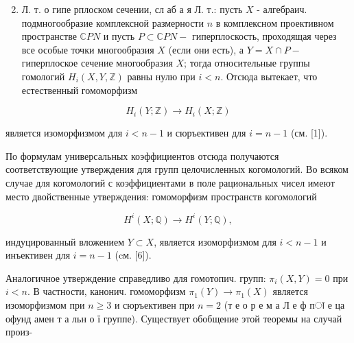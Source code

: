 \documentclass[10pt]{article}
\begin{document}
\begin{enumerate}

  \setcounter{enumi}{1}

  \item Л. т. о гипе рплоском сечении, сл аб а я Л. т.: пусть $X$ - алгебраич. подмногообразие комплексной размерности $n$ в комплексном проективном пространстве $\mathbb{C} P N$ и пусть $P \subset \mathbb{C} P N-$ гиперплоскость, проходящая через все особые точки многообразия $X$ (если они есть), а $Y=X \cap P-$ гиперплоское сечение многообразия $X$; тогда относительные группы гомологий $H_{i}(X, Y, \mathbb{Z})$ равны нулю при $i<n$. Отсюда вытекает, что естественный гомоморфизм

\end{enumerate}



\[

H_{i}(Y ; \mathbb{Z}) \longrightarrow H_{i}(X ; \mathbb{Z})

\]



является изоморфизмом для $i<n-1$ и сюръективен для $i=n-1$ (см. [1]).



По формулам универсальных коэффициентов отсюда получаются соответствующие утверждения для групп целочисленных когомологий. Во всяком случае для когомологий с коэффициентами в поле рациональных чисел имеют место двойственные утверждения: гомоморфизм пространств когомологий



\[

H^{i}(X ; \mathbb{Q}) \longrightarrow H^{i}(Y ; \mathbb{Q}),

\]



индуцированный вложением $Y \subset X$, является изоморфизмом для $i<n-1$ и инъективен для $i=n-1$ (cм. [6]).



Аналогичное утверждение справедливо для гомотопич. групп: $\pi_{i}(X, Y)=0$ при $i<n$. В частности, канонич. гомоморфизм $\pi_{1}(Y) \rightarrow \pi_{1}(X)$ является изоморфизмом при $n \geqslant 3$ и сюръективен при $n=2$ (т е о р е м а Л е ф пा е ца офунд амен т а льн о ї группе). Существует обобщение этой теоремы на случай произ-
\end{document}
